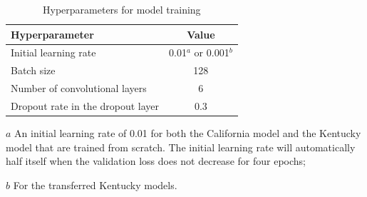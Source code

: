\documentclass[12pt]{article}
\begin{document}

\begin{table}
  \centering
  \begin{threeparttable}[b]
  \caption{Hyperparameters for model training}
    \begin{tabular}{lc}
    \toprule
    Hyperparameter & Value \\
    \midrule
    Initial learning rate & 0.01$^a$ or 0.001$^b$ \\
    Batch size & 128 \\
    Number of convolutional layers & 6 \\
    Dropout rate in the dropout layer & 0.3 \\
    \bottomrule
    \end{tabular}
  \label{hyperparams}
     \begin{tablenotes}
     \item[$a$] An initial learning rate of 0.01 for both the California model and the Kentucky model that are trained from scratch. The initial learning rate will automatically half itself when the validation loss does not decrease for four epochs;
     \item[$b$] For the transferred Kentucky models.
   \end{tablenotes}
\end{threeparttable}
\end{table}
\end{document}

